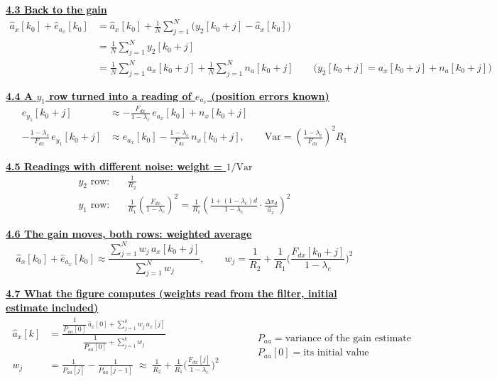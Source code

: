 \documentclass[11pt,a4paper]{ctexart}
\newcommand{\lc}{\lambda_c}
\newcommand{\hd}[1]{\par\bigskip\noindent\underline{\textbf{#1}}}
\begin{document}
\hd{4.3 Back to the gain}
\[
\begin{aligned}
\hat a_x[k_0] + \hat e_{a_x}[k_0]
&= \hat a_x[k_0] + \frac{1}{N}\sum_{j=1}^{N}\big(y_2[k_0+j] - \hat a_x[k_0]\big) \\
&= \frac{1}{N}\sum_{j=1}^{N} y_2[k_0+j] \\
&= \frac{1}{N}\sum_{j=1}^{N} a_x[k_0+j] + \frac{1}{N}\sum_{j=1}^{N} n_a[k_0+j]
\qquad \big(y_2[k_0+j] = a_x[k_0+j] + n_a[k_0+j]\big)
\end{aligned}
\]

\hd{4.4 A $y_1$ row turned into a reading of $e_{a_x}$ (position errors known)}
\[
\begin{aligned}
e_{y_1}[k_0+j] &\approx -\frac{F_{dx}}{1-\lc}\,e_{a_x}[k_0] + n_x[k_0+j] \\
-\frac{1-\lc}{F_{dx}}\,e_{y_1}[k_0+j] &\approx e_{a_x}[k_0] - \frac{1-\lc}{F_{dx}}\,n_x[k_0+j],
\qquad \mathrm{Var} = \left(\frac{1-\lc}{F_{dx}}\right)^{2} R_1
\end{aligned}
\]

\hd{4.5 Readings with different noise: weight = $1/\mathrm{Var}$}
\[
\begin{aligned}
y_2 \text{ row:}&\quad \frac{1}{R_2} \\
y_1 \text{ row:}&\quad \frac{1}{R_1}\left(\frac{F_{dx}}{1-\lc}\right)^{2}
= \frac{1}{R_1}\left(\frac{1+(1-\lc)d}{1-\lc}\cdot\frac{\Delta x_d}{\hat a_x}\right)^{2}
\end{aligned}
\]

\hd{4.6 The gain moves, both rows: weighted average}
\[
\boxed{\;
\hat a_x[k_0] + \hat e_{a_x}[k_0] \approx
\frac{\displaystyle\sum_{j=1}^{N} w_j\, a_x[k_0+j]}{\displaystyle\sum_{j=1}^{N} w_j},
\qquad
w_j = \frac{1}{R_2} + \frac{1}{R_1}\Big(\frac{F_{dx}[k_0+j]}{1-\lc}\Big)^{2}
\;}
\]

\hd{4.7 What the figure computes (weights read from the filter, initial estimate included)}
\[
\boxed{\;
\begin{aligned}
\hat a_x[k] &= \frac{\dfrac{1}{P_{aa}[0]}\,\hat a_x[0] + \displaystyle\sum_{j=1}^{k} w_j\, a_x[j]}{\dfrac{1}{P_{aa}[0]} + \displaystyle\sum_{j=1}^{k} w_j} \\[1ex]
w_j &= \frac{1}{P_{aa}[j]} - \frac{1}{P_{aa}[j-1]} \;\approx\; \frac{1}{R_2} + \frac{1}{R_1}\Big(\frac{F_{dx}[j]}{1-\lc}\Big)^{2}
\end{aligned}
\;}
\qquad
\begin{aligned}
&P_{aa} = \text{variance of the gain estimate} \\
&P_{aa}[0] = \text{its initial value}
\end{aligned}
\]
\end{document}
